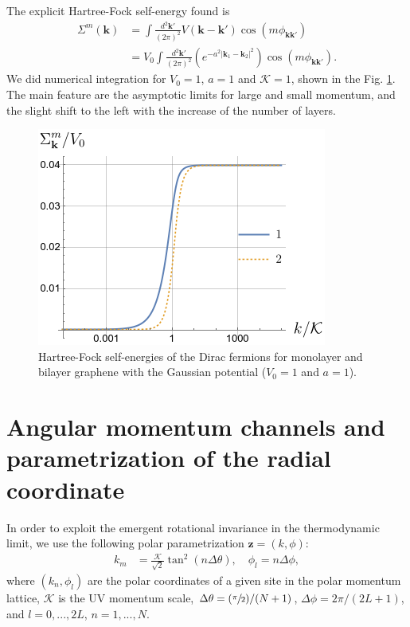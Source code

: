 \documentclass[english,aps,prd,nofootinbib,twocolumn]{revtex4-1}
\begin{document}
The explicit Hartree-Fock self-energy found is
\begin{equation}
\begin{split}
\Sigma^{m}(\mathbf{k }) &= 
\int \frac{d^2 \mathbf{k'}}{(2\pi)^2}
V(\mathbf{k-k'	})\cos(m\phi_{\mathbf{kk'}}) \\ &= 
V_{0}
\int \frac{d^2 \mathbf{k'}}{(2\pi)^2}
\left(
e^{-a^{2}|\mathbf{k}_{1}-\mathbf{k}_{2}|^{2}}
\right)
\cos(m\phi_{\mathbf{kk'}}).
\end{split}
\end{equation}
We did numerical integration for $V_{0}=1$, $a=1$ and $\mathcal{K}=1$, shown in the Fig.  \ref{fig:Multilayer-Self-Energies}. The main feature are the asymptotic limits for large and small momentum, and the slight shift to the left with the increase of the number of layers. 
\begin{figure}[h]
\centering
\includegraphics[scale=0.6]{GaussSelfEnergies.png}
\caption{Hartree-Fock self-energies of the Dirac fermions for monolayer and bilayer graphene with the Gaussian potential ($V_{0}=1$ and $a=1$). }
\label{fig:Multilayer-Self-Energies}
\end{figure}

\section{Angular momentum channels and parametrization of the radial coordinate}
In order to exploit the emergent rotational invariance in the thermodynamic limit, we use the following polar parametrization $\mathbf{z}=(k,\phi)$:
\begin{equation}
\label{eq:Tangential-radius}
\begin{split}
    k_{m} &= \frac{\mathcal{K}}{\sqrt{2}} \tan^{2}(n \Delta \theta), 
    \quad \phi_{l}=n\Delta \phi,
\end{split}
\end{equation}
where $(k_n,\phi_l)$ are the polar coordinates of a given site in the polar momentum lattice, $\mathcal{K}$ is the UV momentum scale, $\Delta \theta = (\sfrac{\pi}{2}) /(N+1)$, $\Delta \phi = 2\pi/(2L+1)$, and $l={0,...,2L}$, $n={1,...,N}$. 
\end{document}

